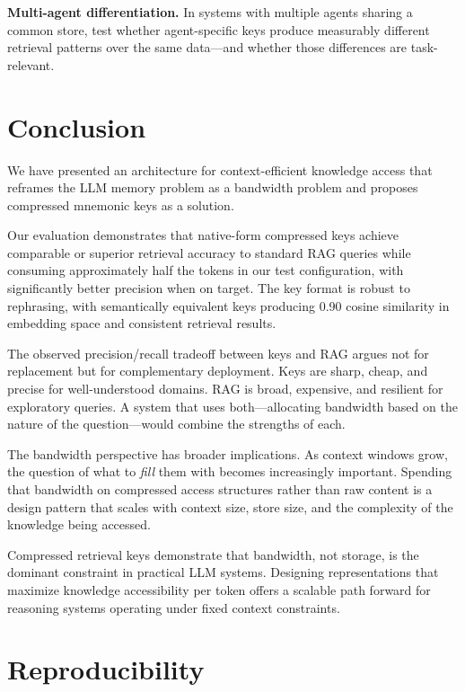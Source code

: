 \documentclass{article}
\begin{document}
\textbf{Multi-agent differentiation.} In systems with multiple agents sharing a common store, test whether agent-specific keys produce measurably different retrieval patterns over the same data---and whether those differences are task-relevant.

\section{Conclusion}
\label{sec:conclusion}

We have presented an architecture for context-efficient knowledge access that reframes the LLM memory problem as a bandwidth problem and proposes compressed mnemonic keys as a solution.

Our evaluation demonstrates that native-form compressed keys achieve comparable or superior retrieval accuracy to standard RAG queries while consuming approximately half the tokens in our test configuration, with significantly better precision when on target. The key format is robust to rephrasing, with semantically equivalent keys producing 0.90 cosine similarity in embedding space and consistent retrieval results.

The observed precision/recall tradeoff between keys and RAG argues not for replacement but for complementary deployment. Keys are sharp, cheap, and precise for well-understood domains. RAG is broad, expensive, and resilient for exploratory queries. A system that uses both---allocating bandwidth based on the nature of the question---would combine the strengths of each.

The bandwidth perspective has broader implications. As context windows grow, the question of what to \textit{fill} them with becomes increasingly important. Spending that bandwidth on compressed access structures rather than raw content is a design pattern that scales with context size, store size, and the complexity of the knowledge being accessed.

Compressed retrieval keys demonstrate that bandwidth, not storage, is the dominant constraint in practical LLM systems. Designing representations that maximize knowledge accessibility per token offers a scalable path forward for reasoning systems operating under fixed context constraints.

\section*{Reproducibility}
\end{document}
